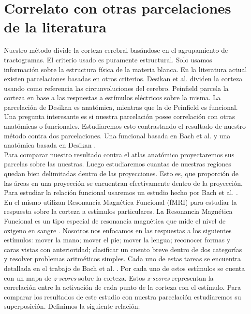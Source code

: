 \section{Correlato con otras parcelaciones de la literatura}
\label{sec:cont_correlato}

Nuestro m\'etodo divide la corteza cerebral bas\'andose en el 
agrupamiento de tractogramas. El criterio usado es puramente estructural.
Solo usamos informaci\'on sobre la estructura f\'isica de la materia
blanca. En la literatura actual existen parcelaciones basadas en otros
criterios. Desikan et al. \cite{Desikan2006} dividen la corteza usando
como referencia las circunvoluciones del cerebro. Peinfield 
\cite{Penfield1954} parcela la corteza en base a las respuestas a 
est\'imulos el\'ectricos sobre la misma. La parcelaci\'on de Desikan es
anat\'omica, mientras que la de Peinfield es funcional. Una pregunta
interesante es si nuestra parcelaci\'on posee correlaci\'on con otras
anat\'omicas o funcionales. Estudiaremos esto contrastando el resultado
de nuestro m\'etodo contra dos parcelaciones. Una funcional basada en 
Bach et al. \cite{Barch2013} y una anat\'omica basada en Desikan
\cite{Desikan2006}.\\

Para comparar nuestro resultado contra el atlas anat\'omico 
proyectaremos sus parcelas sobre las nuestras. Luego estudiaremos cuantas
de nuestras regiones quedan bien delimitadas dentro de las proyecciones.
Esto es, que proporci\'on de las \'areas en una proyecci\'on se
encuentran efectivamente dentro de la proyecci\'on. \\

Para estudiar la relaci\'on funcional usaremos un estudio hecho por
Bach et al. \cite{Barch2013}.
En el mismo utilizan Resonancia Magn\'etica Funcional
(fMRI) para estudiar la respuesta sobre la corteza a est\'imulos
particulares. La Resonancia Magn\'etica Funcional es un tipo especial de
resonancia magn\'etica que mide el nivel de oxigeno en sangre 
\cite{Ogawa1990}. Nosotros nos enfocamos en las respuestas a los siguientes
est\'imulos: mover la mano; mover el pie; mover la lengua; reconocer formas
y caras vistas con anterioridad; clasificar un cuento breve dentro de dos
categor\'ias y resolver problemas aritm\'eticos simples. Cada uno de estas
tareas se encuentra detallada en el trabajo de Bach et al. \cite{Barch2013}.
Por cada uno de estos est\'imulos se cuenta con un mapa de 
\textit{z-scores} sobre la corteza. Estos \textit{z-scores} representan la
correlaci\'on entre la activaci\'on de cada punto de la corteza con el 
est\'imulo. Para comparar los resultados de este estudio con nuestra 
parcelaci\'on estudiaremos su superposici\'on. Definimos la siguiente 
relaci\'on: \\

